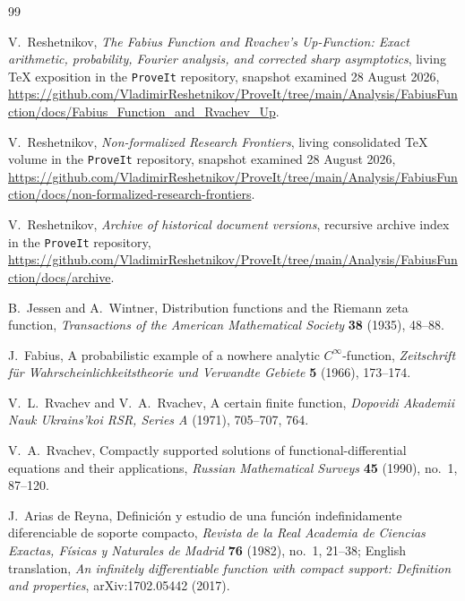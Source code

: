 \documentclass[11pt]{article}
\theoremstyle{definition}
\theoremstyle{remark}
\begin{document}
\begin{thebibliography}{99}

V.~Reshetnikov,
\newblock \emph{The Fabius Function and Rvachev's Up-Function: Exact arithmetic,
probability, Fourier analysis, and corrected sharp asymptotics},
\newblock living TeX exposition in the \texttt{ProveIt} repository, snapshot examined
28 August 2026,
\newblock \url{https://github.com/VladimirReshetnikov/ProveIt/tree/main/Analysis/FabiusFunction/docs/Fabius_Function_and_Rvachev_Up}.

V.~Reshetnikov,
\newblock \emph{Non-formalized Research Frontiers},
\newblock living consolidated TeX volume in the \texttt{ProveIt} repository, snapshot
examined 28 August 2026,
\newblock \url{https://github.com/VladimirReshetnikov/ProveIt/tree/main/Analysis/FabiusFunction/docs/non-formalized-research-frontiers}.

V.~Reshetnikov,
\newblock \emph{Archive of historical document versions},
\newblock recursive archive index in the \texttt{ProveIt} repository,
\newblock \url{https://github.com/VladimirReshetnikov/ProveIt/tree/main/Analysis/FabiusFunction/docs/archive}.

B.~Jessen and A.~Wintner,
\newblock Distribution functions and the Riemann zeta function,
\newblock \emph{Transactions of the American Mathematical Society} \textbf{38}
(1935), 48--88.

J.~Fabius,
\newblock A probabilistic example of a nowhere analytic $C^\infty$-function,
\newblock \emph{Zeitschrift f\"ur Wahrscheinlichkeitstheorie und Verwandte Gebiete}
\textbf{5} (1966), 173--174.

V.~L.~Rvachev and V.~A.~Rvachev,
\newblock A certain finite function,
\newblock \emph{Dopovidi Akademii Nauk Ukrains'koi RSR, Series A} (1971),
705--707, 764.

V.~A.~Rvachev,
\newblock Compactly supported solutions of functional-differential equations and their
applications,
\newblock \emph{Russian Mathematical Surveys} \textbf{45} (1990), no.~1, 87--120.

J.~Arias de Reyna,
\newblock Definici\'on y estudio de una funci\'on indefinidamente diferenciable de
soporte compacto,
\newblock \emph{Revista de la Real Academia de Ciencias Exactas, F\'isicas y Naturales
de Madrid} \textbf{76} (1982), no.~1, 21--38;
English translation, \emph{An infinitely differentiable function with compact support:
Definition and properties}, arXiv:1702.05442 (2017).


\end{thebibliography}
\end{document}
